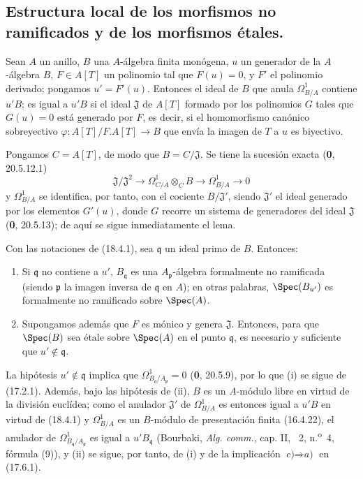 \subsection{Estructura local de los morfismos no ramificados y de los morfismos étales.}
\label{subsection:IV.18.4}


\begin{lemma}[18.4.1]
\label{IV.18.4.1}
Sean $A$ un anillo, $B$ una $A$-álgebra finita monógena, $u$ un generador de la $A$-álgebra $B$, $F\in A[T]$ un polinomio tal que $F(u)=0$, y $F'$ el polinomio derivado; pongamos $u'=F'(u)$. Entonces el ideal de $B$ que anula $\Omega^1_{B/A}$ contiene $u'B$; es igual a $u'B$ si el ideal $\mathfrak J$ de $A[T]$ formado por los polinomios $G$ tales que $G(u)=0$ está generado por $F$, es decir, si el homomorfismo canónico sobreyectivo $\varphi:A[T]/F.A[T]\to B$ que envía la imagen de $T$ a $u$ es biyectivo.
\end{lemma}

Pongamos $C=A[T]$, de modo que $B=C/\mathfrak J$. Se tiene la sucesión exacta (\textbf 0, 20.5.12.1)
\[
  \mathfrak J/\mathfrak J^2\longrightarrow\Omega^1_{C/A}\otimes_C B\longrightarrow\Omega^1_{B/A}\longrightarrow 0
\]
y $\Omega^1_{B/A}$ se identifica, por tanto, con el cociente $B/\mathfrak J'$, siendo $\mathfrak J'$ el ideal generado por los elementos $G'(u)$, donde $G$ recorre un sistema de generadores del ideal $\mathfrak J$ (\textbf 0, 20.5.13); de aquí se sigue inmediatamente el lema.

\begin{proposition}[18.4.2]
\label{IV.18.4.2}
Con las notaciones de \textup{(18.4.1)}, sea $\mathfrak q$ un ideal primo de $B$. Entonces:
\begin{enumerate}
  \item[\textup{(i)}] Si $\mathfrak q$ no contiene a $u'$, $B_{\mathfrak q}$ es una $A_{\mathfrak p}$-álgebra formalmente no ramificada \textup{(}siendo $\mathfrak p$ la imagen inversa de $\mathfrak q$ en $A$\textup{)}; en otras palabras, $\Spec(B_{u'})$ es formalmente no ramificado sobre $\Spec(A)$.
  \item[\textup{(ii)}] Supongamos además que $F$ es mónico y genera $\mathfrak J$. Entonces, para que $\Spec(B)$ sea étale sobre $\Spec(A)$ en el punto $\mathfrak q$, es necesario y suficiente que $u'\notin\mathfrak q$.
\end{enumerate}
\end{proposition}

La hipótesis $u'\notin\mathfrak q$ implica que $\Omega^1_{B_{\mathfrak q}/A_{\mathfrak p}}=0$ (\textbf 0, 20.5.9), por lo que (i) se sigue de (17.2.1). Además, bajo las hipótesis de (ii), $B$ es un $A$-módulo libre en virtud de la división euclídea; como el anulador $\mathfrak J'$ de $\Omega^1_{B/A}$ es entonces igual a $u'B$ en virtud de (18.4.1) y $\Omega^1_{B/A}$ es un $B$-módulo de presentación finita (16.4.22), el anulador de $\Omega^1_{B_{\mathfrak q}/A_{\mathfrak p}}$ es igual a $u'B_{\mathfrak q}$ (Bourbaki, \emph{Alg. comm.}, cap. II, \textsection~2, n.\textsuperscript{o}~4, fórmula (9)), y (ii) se sigue, por tanto, de (i) y de la implicación $\textit{c)}\Rightarrow\textit{a)}$ en (17.6.1).

